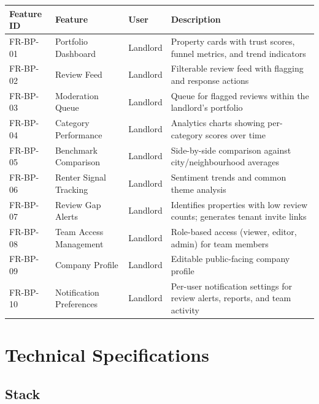 \documentclass[11pt,letterpaper]{article}
\begin{document}
\begin{longtable}{p{3.5cm} p{4cm} p{2.5cm} p{3.5cm}}
\toprule
\textbf{Feature ID} & \textbf{Feature} & \textbf{User} & \textbf{Description} \\
\midrule
\endhead
FR-BP-01 &
Portfolio Dashboard &
Landlord &
Property cards with trust scores, funnel metrics, and trend indicators \\
\addlinespace
FR-BP-02 &
Review Feed &
Landlord &
Filterable review feed with flagging and response actions \\
\addlinespace
FR-BP-03 &
Moderation Queue &
Landlord &
Queue for flagged reviews within the landlord's portfolio \\
\addlinespace
FR-BP-04 &
Category Performance &
Landlord &
Analytics charts showing per-category scores over time \\
\addlinespace
FR-BP-05 &
Benchmark Comparison &
Landlord &
Side-by-side comparison against city/neighbourhood averages \\
\addlinespace
FR-BP-06 &
Renter Signal Tracking &
Landlord &
Sentiment trends and common theme analysis \\
\addlinespace
FR-BP-07 &
Review Gap Alerts &
Landlord &
Identifies properties with low review counts; generates tenant invite links \\
\addlinespace
FR-BP-08 &
Team Access Management &
Landlord &
Role-based access (viewer, editor, admin) for team members \\
\addlinespace
FR-BP-09 &
Company Profile &
Landlord &
Editable public-facing company profile \\
\addlinespace
FR-BP-10 &
Notification Preferences &
Landlord &
Per-user notification settings for review alerts, reports, and team activity \\
\bottomrule
\end{longtable}

\section{Technical Specifications}

\subsection{Stack}
\end{document}
